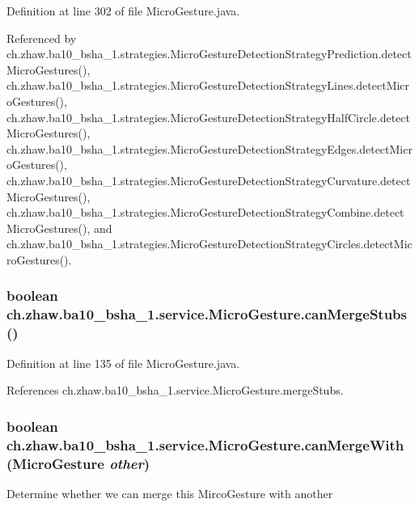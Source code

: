 Definition at line 302 of file MicroGesture.java.

Referenced by ch.zhaw.ba10\_\-bsha\_\-1.strategies.MicroGestureDetectionStrategyPrediction.detectMicroGestures(), ch.zhaw.ba10\_\-bsha\_\-1.strategies.MicroGestureDetectionStrategyLines.detectMicroGestures(), ch.zhaw.ba10\_\-bsha\_\-1.strategies.MicroGestureDetectionStrategyHalfCircle.detectMicroGestures(), ch.zhaw.ba10\_\-bsha\_\-1.strategies.MicroGestureDetectionStrategyEdges.detectMicroGestures(), ch.zhaw.ba10\_\-bsha\_\-1.strategies.MicroGestureDetectionStrategyCurvature.detectMicroGestures(), ch.zhaw.ba10\_\-bsha\_\-1.strategies.MicroGestureDetectionStrategyCombine.detectMicroGestures(), and ch.zhaw.ba10\_\-bsha\_\-1.strategies.MicroGestureDetectionStrategyCircles.detectMicroGestures().\hypertarget{classch_1_1zhaw_1_1ba10__bsha__1_1_1service_1_1MicroGesture_af67a2c2d66724e55b7b3af29e220b91c}{
\subsubsection[{canMergeStubs}]{\setlength{\rightskip}{0pt plus 5cm}boolean ch.zhaw.ba10\_\-bsha\_\-1.service.MicroGesture.canMergeStubs ()}}
\label{classch_1_1zhaw_1_1ba10__bsha__1_1_1service_1_1MicroGesture_af67a2c2d66724e55b7b3af29e220b91c}


Definition at line 135 of file MicroGesture.java.

References ch.zhaw.ba10\_\-bsha\_\-1.service.MicroGesture.mergeStubs.\hypertarget{classch_1_1zhaw_1_1ba10__bsha__1_1_1service_1_1MicroGesture_aa86fa9810f2f6155bf027c5c358861bd}{
\subsubsection[{canMergeWith}]{\setlength{\rightskip}{0pt plus 5cm}boolean ch.zhaw.ba10\_\-bsha\_\-1.service.MicroGesture.canMergeWith ({\bf MicroGesture} {\em other})}}
\label{classch_1_1zhaw_1_1ba10__bsha__1_1_1service_1_1MicroGesture_aa86fa9810f2f6155bf027c5c358861bd}
Determine whether we can merge this MircoGesture with another


